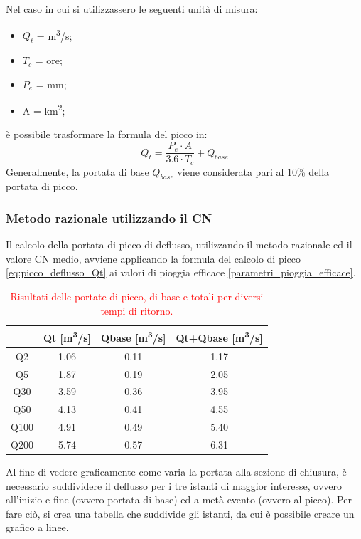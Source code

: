 Nel caso in cui si utilizzassero le seguenti unità di misura:
\begin{itemize}
    \item $Q_t$ = \unit{m^3/s};
    \item $T_c$ = ore;
    \item $P_e$ = mm;
    \item A = \unit{km^2};
\end{itemize}
è possibile trasformare la formula del picco in:
\begin{equation}
    Q_t = \frac{P_e \cdot A}{3.6 \cdot T_c} + Q_{base}
    \label{eq:picco_deflusso_Qt}
\end{equation}
Generalmente, la portata di base $Q_{base}$ viene considerata pari al 10\% della portata di picco.

\subsubsection{Metodo razionale utilizzando il CN}
Il calcolo della portata di picco di deflusso, utilizzando il metodo razionale ed il valore CN medio, avviene applicando la formula del calcolo di picco \eqref{eq:picco_deflusso_Qt} ai valori di pioggia efficace \ref{parametri_pioggia_efficace}.

\begin{table}[H] \centering
    \caption{\textcolor{red}{Risultati delle portate di picco, di base e totali per diversi tempi di ritorno.}}
    \begin{tabular}{cccc}
    \toprule
         & \multicolumn{1}{c}{Qt [\unit{m^3/s}]} & \multicolumn{1}{c}{Qbase [\unit{m^3/s}]} & \multicolumn{1}{c}{Qt+Qbase [\unit{m^3/s}]} \\
    \midrule
    Q2   & 1.06 &  0.11 & 1.17 \\
    Q5   & 1.87        & 0.19         & 2.05        \\
    Q30  & 3.59   & 0.36        & 3.95         \\
    Q50  & 4.13     & 0.41       & 4.55         \\
    Q100 & 4.91      & 0.49     & 5.40           \\
    Q200 & 5.74      & 0.57  & 6.31     \\
    \bottomrule      
    \end{tabular}
    \end{table}

Al fine di vedere graficamente come varia la portata alla sezione di chiusura, è necessario suddividere il deflusso per i tre istanti di maggior interesse, ovvero all'inizio e fine (ovvero portata di base) ed a metà evento (ovvero al picco). Per fare ciò, si crea una tabella che suddivide gli istanti, da cui è possibile creare un grafico a linee.

